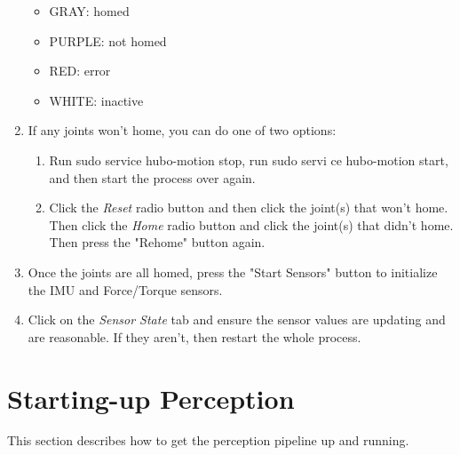 \documentclass[letterpaper, 10 pt]{report}
\begin{document}
\begin{enumerate}
    \begin{itemize}
      \item GRAY: homed
      \item PURPLE: not homed
      \item RED: error
      \item WHITE: inactive
    \end{itemize}
  \item If any joints won't home, you can do one of two options:
    \begin{enumerate}
      \item Run sudo service hubo-motion stop, run sudo servi	ce hubo-motion start, and then start the process over again.
      \item Click the \textit{Reset} radio button and then click the joint(s) that won't home. Then click the \textit{Home} radio button and click the joint(s) that didn't home. Then press the "Rehome" button again.
    \end{enumerate}
  \item Once the joints are all homed, press the "Start Sensors" button to initialize the IMU and Force/Torque sensors.
  \item Click on the \textit{Sensor State} tab and ensure the sensor values are updating and are reasonable. If they aren't, then restart the whole process.
\end{enumerate}

\section{Starting-up Perception}
This section describes how to get the perception pipeline up and running. 
\end{document}
